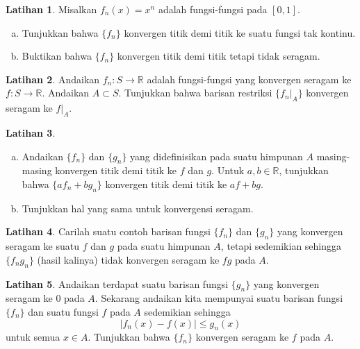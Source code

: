 \documentclass[12pt,openany]{book}
\newcommand{\abs}[1]{\left\lvert {#1} \right\rvert}
\newcommand{\R}{{\mathbb{R}}}
\theoremstyle{plain}
\theoremstyle{remark}
\theoremstyle{definition}
\newenvironment{exbox}{%
    \def\FrameCommand{\vrule width 1pt \relax\hspace{10pt}}%
    \MakeFramed{\advance\hsize-\width\FrameRestore}%
}{%
    \endMakeFramed
}
\newenvironment{exparts}{%
    \leavevmode\begin{enumerate}[a),noitemsep,topsep=0pt,parsep=0pt,partopsep=0pt]
}{%
    \end{enumerate}
}
\theoremstyle{exercise}
\newtheorem{exercise}{Latihan}[section]
\theoremstyle{example}
\begin{document}
\begin{exbox}
\begin{exercise} \label{exercise:limitnotcont}
Misalkan $f_n(x)=x^n$ adalah fungsi-fungsi pada $[0,1]$.
\begin{exparts}
\item
Tunjukkan bahwa $\{ f_n \}$ konvergen titik demi titik ke suatu fungsi tak kontinu.
\item
Buktikan bahwa $\{ f_n \}$ konvergen
titik demi titik tetapi tidak seragam.
\end{exparts}
\end{exercise}

\begin{exercise}
Andaikan $f_n \colon S \to \R$ adalah fungsi-fungsi yang konvergen seragam
ke $f \colon S \to \R$.  Andaikan $A \subset S$.  Tunjukkan bahwa
barisan restriksi $\{ f_n|_A \}$ konvergen seragam ke $f|_A$.
\end{exercise}

\begin{exercise}
\begin{exparts}
\item
Andaikan $\{ f_n \}$ dan $\{ g_n \}$ yang didefinisikan pada suatu himpunan $A$ masing-masing
konvergen titik demi titik ke $f$ dan $g$.
Untuk $a,b \in \R$,
tunjukkan bahwa $\{ a f_n+ b g_n \}$ konvergen titik demi titik ke $a f+ b g$.
\item
Tunjukkan hal yang sama untuk konvergensi seragam.
\end{exparts}
\end{exercise}

\begin{exercise}
Carilah suatu contoh barisan fungsi $\{ f_n \}$ dan $\{ g_n \}$
yang konvergen seragam ke suatu $f$ dan $g$ pada suatu himpunan $A$, tetapi sedemikian sehingga
$\{ f_ng_n \}$ (hasil kalinya) tidak konvergen seragam ke $fg$ pada $A$.
\end{exercise}

\begin{exercise}
Andaikan terdapat suatu barisan fungsi $\{ g_n \}$ yang konvergen seragam
ke $0$ pada $A$.  Sekarang andaikan kita mempunyai suatu barisan fungsi
$\{ f_n \}$ dan suatu fungsi $f$ pada $A$ sedemikian sehingga
\begin{equation*}
\abs{f_n(x) - f(x)} \leq g_n(x) 
\end{equation*}
untuk semua $x \in A$.  Tunjukkan bahwa $\{ f_n \}$ konvergen seragam ke $f$ pada $A$.
\end{exercise}


\end{exbox}
\end{document}
